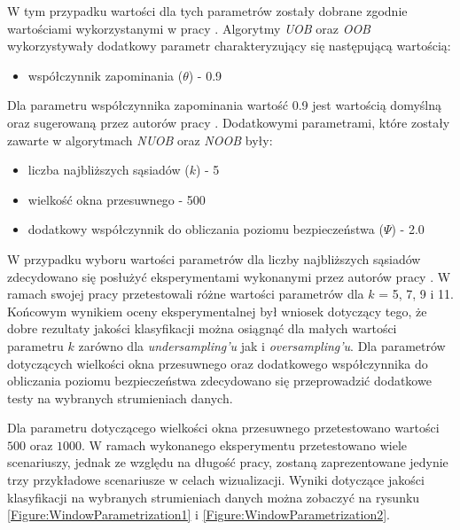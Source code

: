 \noindent W tym przypadku wartości dla tych parametrów zostały dobrane zgodnie wartościami wykorzystanymi w pracy \cite{Article:TypyPrzykladow}. Algorytmy \textit{UOB} oraz \textit{OOB} wykorzystywały dodatkowy parametr charakteryzujący się następującą wartością:

\begin{itemize}
    \item współczynnik zapominania ($\theta$) - 0.9
\end{itemize}

\noindent Dla parametru współczynnika zapominania wartość 0.9 jest wartością domyślną oraz sugerowaną przez autorów pracy \cite{Article:OBSecond}. Dodatkowymi parametrami, które zostały zawarte w algorytmach \textit{NUOB} oraz \textit{NOOB} były:

\begin{itemize}
    \item liczba najbliższych sąsiadów ($k$) - 5
    \item wielkość okna przesuwnego - 500
    \item dodatkowy współczynnik do obliczania poziomu bezpieczeństwa ($\Psi$) - 2.0
\end{itemize}

\noindent W przypadku wyboru wartości parametrów dla liczby najbliższych sąsiadów zdecydowano się posłużyć eksperymentami wykonanymi przez autorów pracy \cite{Article:NNBag}. W ramach swojej pracy przetestowali różne wartości parametrów dla $k$ = 5, 7, 9 i 11. Końcowym wynikiem oceny eksperymentalnej był wniosek dotyczący tego, że dobre rezultaty jakości klasyfikacji można osiągnąć dla małych wartości parametru $k$ zarówno dla \textit{undersampling'u} jak i \textit{oversampling'u}. Dla parametrów dotyczących wielkości okna przesuwnego oraz dodatkowego współczynnika do obliczania poziomu bezpieczeństwa zdecydowano się przeprowadzić dodatkowe testy na wybranych strumieniach danych.

Dla parametru dotyczącego wielkości okna przesuwnego przetestowano wartości $500$ oraz $1000$. W ramach wykonanego eksperymentu przetestowano wiele scenariuszy, jednak ze względu na długość pracy, zostaną zaprezentowane jedynie trzy przykładowe scenariusze w celach wizualizacji. Wyniki dotyczące jakości klasyfikacji na wybranych strumieniach danych można zobaczyć na rysunku \ref{Figure:WindowParametrization1} i \ref{Figure:WindowParametrization2}.


